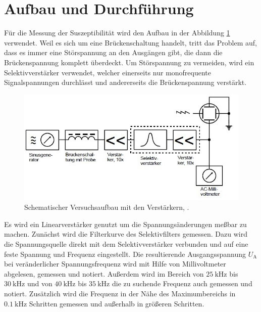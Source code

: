 \section{Aufbau und Durchführung}
\label{sec:Durchführung}
Für die Messung der Suszeptibilität wird den Aufbau in der Abbildung \ref{fig:blockschaltbildung} verwendet. Weil es sich um eine Brückenschaltung handelt, tritt das Problem auf, dass es immer eine Störspannung an den Ausgängen gibt, die dann die Brückenspannung komplett überdeckt. Um Störspannung zu vermeiden, wird ein Selektivverstärker verwendet, welcher einerseits nur monofrequente Signalspannungen durchlässt und andererseits die Brückenspannung verstärkt.

\begin{figure}[h!]
	\centering
	\includegraphics[width=0.9\linewidth]{Blockschaltbildung.jpg}
	\caption{Schematischer Versuchsaufbau mit den Verstärkern, \cite[12]{anleitung606}.}
	\label{fig:blockschaltbildung}
\end{figure}

Es wird ein Linearverstärker genutzt um die Spannungsänderungen meßbar zu machen. Zunächst wird die Filterkurve des Selektivfilters gemessen. Dazu wird die Spannungsquelle direkt mit dem Selektivverstärker verbunden und auf eine feste Spannung und Frequenz eingestellt. 
Die resultierende Ausgangsspannung $U_\text{A}$ bei veränderlicher Spannungsfrequenz wird mit Hilfe von Millivoltmeter abgelesen, gemessen und notiert. Außerdem wird im Bereich von $\SI{25}{\kilo\hertz}$ bis $\SI{30}{\kilo\hertz}$ und von $\SI{40}{\kilo\hertz}$ bis $\SI{35}{\kilo\hertz}$ die zu suchende Frequenz auch gemessen und notiert. Zusätzlich wird die Frequenz in der Nähe des Maximumbereichs in $\SI{0,1}{\kilo\hertz}$ Schritten gemessen und außerhalb in größeren Schritten. 

